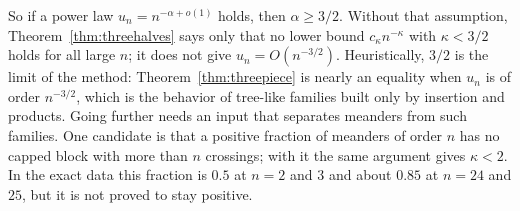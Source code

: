 So if a power law $u_n=n^{-\alpha+o(1)}$ holds, then $\alpha\ge3/2$. Without that assumption,
Theorem~\ref{thm:threehalves} says only that no lower bound $c_\kappa n^{-\kappa}$ with $\kappa<3/2$ holds
for all large $n$; it does not give $u_n=O(n^{-3/2})$. Heuristically, $3/2$ is the limit of
the method: Theorem~\ref{thm:threepiece} is nearly an equality when $u_n$ is of order $n^{-3/2}$,
which is the behavior of tree-like families built only by insertion and products. Going further needs
an input that separates meanders from such families. One candidate is that a positive fraction of
meanders of order $n$ has no capped block with more than $n$ crossings; with it the same argument
gives $\kappa<2$. In the exact data this fraction is $0.5$ at $n=2$ and $3$ and about $0.85$ at
$n=24$ and $25$, but it is not proved to stay positive.
